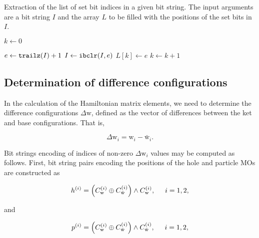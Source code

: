 \documentclass[12pt,a4paper]{report}
\newcommand*\code[1]{\mbox{\texttt{{#1}}}} %
\begin{document}
\begin{algorithm}
  \caption{Extraction of the list of set bit indices in a given bit
    string. The input arguments are a bit string $I$ and the array $L$
    to be filled with the positions of the set bits in
    $I$.}\label{alg:list_from_bitstring}

  \begin{algorithmic}[1]

    
    \State $k \leftarrow 0$ 


    \State $e \leftarrow \code{trailz}(I) + 1$
    \State $I \leftarrow \code{ibclr}(I,e)$
    \State $L[k] \leftarrow e$
    \State $k \leftarrow k + 1$
    \EndWhile
    
    \EndProcedure

  \end{algorithmic}
\end{algorithm}

\subsection{Determination of difference configurations}
In the calculation of the Hamiltonian matrix elements, we need to
determine the difference configurations $\Delta \text{w}$, defined as
the vector of differences between the ket and base
configurations. That is,

\begin{equation}
  \Delta \text{w}_i = \text{w}_i - \bar{\text{w}}_i.
\end{equation}

Bit strings encoding of indices of non-zero $\Delta \text{w}_{i}$
values may be computed as follows. First, bit string pairs encoding
the positions of the hole and particle MOs are constructed as

\begin{equation}
  h^{(i)} = \left( C_{\text{w}}^{(i)} \oplus C_{\bar{\text{w}}}^{(i)}
  \right) \wedge C_{\text{w}}^{(i)}, \hspace{0.5cm} i=1,2,
\end{equation}

\noindent
and

\begin{equation}
  p^{(i)} = \left( C_{\text{w}}^{(i)} \oplus C_{\bar{\text{w}}}^{(i)}
  \right) \wedge C_{\bar{\text{w}}}^{(i)}, \hspace{0.5cm} i=1,2,
\end{equation}
\end{document}
